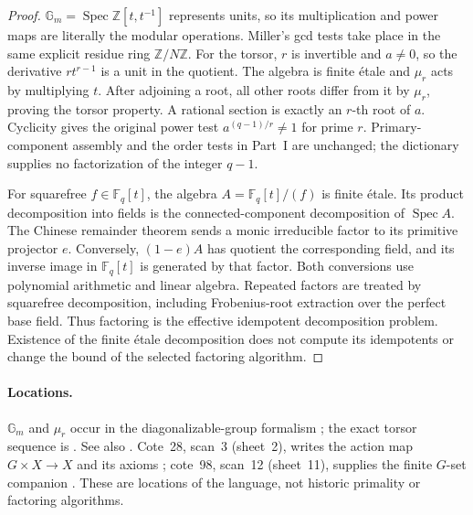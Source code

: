 \begin{proof}
$\mathbb G_m=\operatorname{Spec}\mathbb Z[t,t^{-1}]$ represents units,
so its multiplication and power maps are literally the modular operations.
Miller's gcd tests take place in the same explicit residue ring
$\mathbb Z/N\mathbb Z$.
For the torsor, $r$ is invertible and $a\ne0$, so the derivative
$rt^{r-1}$ is a unit in the quotient.  The algebra is finite étale and
$\mu_r$ acts by multiplying $t$.  After adjoining a root, all other roots
differ from it by $\mu_r$, proving the torsor property.  A rational section
is exactly an $r$-th root of $a$.  Cyclicity gives the original power test
$a^{(q-1)/r}\ne1$ for prime $r$.  Primary-component assembly and the order
tests in Part~I are unchanged; the dictionary supplies no factorization of
the integer $q-1$.

For squarefree $f\in\mathbb F_q[t]$, the algebra
$A=\mathbb F_q[t]/(f)$ is finite étale.  Its product decomposition into
fields is the connected-component decomposition of $\operatorname{Spec}A$.
The Chinese remainder theorem sends a monic irreducible factor to its
primitive projector $e$.  Conversely, $(1-e)A$ has quotient the corresponding
field, and its inverse image in $\mathbb F_q[t]$ is generated by that factor.
Both conversions use polynomial arithmetic and linear algebra.  Repeated
factors are treated by squarefree decomposition, including Frobenius-root
extraction over the perfect base field.  Thus factoring is the effective
idempotent decomposition problem.  Existence of the finite étale
decomposition does not compute its idempotents or change the bound of the
selected factoring algorithm.
\end{proof}

\paragraph{Locations.}
$\mathbb G_m$ and $\mu_r$ occur in the diagonalizable-group formalism
\cite[Exp.~VIII 1.1--1.2]{SGA3}; the exact torsor sequence is
\cite[Exp.~IX 3.2]{SGA4}.  See also \cite[Exp.~V \S7]{SGA1}.
Cote~28, scan~3 (sheet~2), writes the action map $G\times X\to X$ and its
axioms \cite{Archive28}; cote~98, scan~12 (sheet~11), supplies the finite
$G$-set companion \cite{Archive98}.  These are locations of the language,
not historic primality or factoring algorithms.

